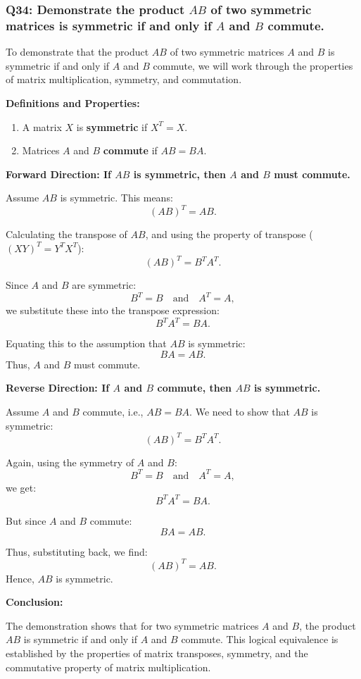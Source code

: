 \documentclass[8pt]{article}
\begin{document}
\subsubsection*{Q34: Demonstrate the product \(AB\) of two symmetric matrices is symmetric if and only if \(A\) and \(B\) commute.}

To demonstrate that the product \(AB\) of two symmetric matrices \(A\) and \(B\) is symmetric if and only if \(A\) and \(B\) commute, we will work through the properties of matrix multiplication, symmetry, and commutation.

\textbf{Definitions and Properties:}
\begin{enumerate}
    \item A matrix \(X\) is \textbf{symmetric} if \(X^T = X\).
    \item Matrices \(A\) and \(B\) \textbf{commute} if \(AB = BA\).
\end{enumerate}

\textbf{Forward Direction: If \(AB\) is symmetric, then \(A\) and \(B\) must commute.}

Assume \(AB\) is symmetric. This means:
\[
(AB)^T = AB.
\]

Calculating the transpose of \(AB\), and using the property of transpose (\((XY)^T = Y^T X^T\)):
\[
(AB)^T = B^T A^T.
\]

Since \(A\) and \(B\) are symmetric:
\[
B^T = B \quad \text{and} \quad A^T = A,
\]
we substitute these into the transpose expression:
\[
B^T A^T = BA.
\]

Equating this to the assumption that \(AB\) is symmetric:
\[
BA = AB.
\]
Thus, \(A\) and \(B\) must commute.

\textbf{Reverse Direction: If \(A\) and \(B\) commute, then \(AB\) is symmetric.}

Assume \(A\) and \(B\) commute, i.e., \(AB = BA\). We need to show that \(AB\) is symmetric:
\[
(AB)^T = B^T A^T.
\]

Again, using the symmetry of \(A\) and \(B\):
\[
B^T = B \quad \text{and} \quad A^T = A,
\]
we get:
\[
B^T A^T = BA.
\]

But since \(A\) and \(B\) commute:
\[
BA = AB.
\]

Thus, substituting back, we find:
\[
(AB)^T = AB.
\]
Hence, \(AB\) is symmetric.

\textbf{Conclusion:}

The demonstration shows that for two symmetric matrices \(A\) and \(B\), the product \(AB\) is symmetric if and only if \(A\) and \(B\) commute. This logical equivalence is established by the properties of matrix transposes, symmetry, and the commutative property of matrix multiplication.
\end{document}
